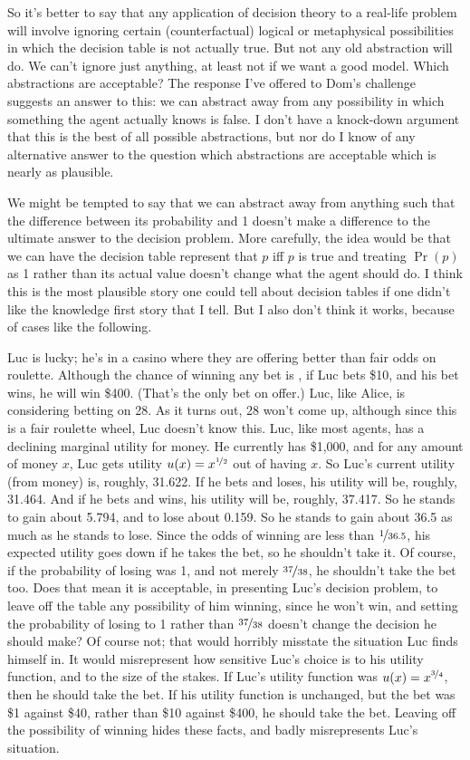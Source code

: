 \documentclass[11pt,oneside]{book}
\begin{document}
So it's better to say that any application of decision theory to a real-life problem will involve ignoring certain (counterfactual) logical or metaphysical possibilities in which the decision table is not actually true. But not any old abstraction will do. We can't ignore just anything, at least not if we want a good model. Which abstractions are acceptable? The response I've offered to Dom's challenge suggests an answer to this: we can abstract away from any possibility in which something the agent actually knows is false. I don't have a knock-down argument that this is the best of all possible abstractions, but nor do I know of any alternative answer to the question which abstractions are acceptable which is nearly as plausible.

We might be tempted to say that we can abstract away from anything such that the difference between its probability and 1 doesn't make a difference to the ultimate answer to the decision problem. More carefully, the idea would be that we can have the decision table represent that $p$ iff $p$ is true and treating $\Pr(p)$ as 1 rather than its actual value doesn't change what the agent should do. I think this is the most plausible story one could tell about decision tables if one didn't like the knowledge first story that I tell. But I also don't think it works, because of cases like the following.

Luc is lucky; he's in a casino where they are offering better than fair odds on roulette. Although the chance of winning any bet is , if Luc bets \$10, and his bet wins, he will win \$400. (That's the only bet on offer.) Luc, like Alice, is considering betting on 28. As it turns out, 28 won't come up, although since this is a fair roulette wheel, Luc doesn't know this. Luc, like most agents, has a declining marginal utility for money. He currently has \$1,000, and for any amount of money $x$, Luc gets utility $u(x) = x^{\nicefrac{1}{2}}$ out of having $x$. So Luc's current utility (from money) is, roughly, 31.622. If he bets and loses, his utility will be, roughly, 31.464. And if he bets and wins, his utility will be, roughly, 37.417. So he stands to gain about 5.794, and to lose about 0.159. So he stands to gain about 36.5 as much as he stands to lose. Since the odds of winning are less than $\nicefrac{1}{36.5}$, his expected utility goes down if he takes the bet, so he shouldn't take it. Of course, if the probability of losing was 1, and not merely $\nicefrac{37}{38}$, he shouldn't take the bet too. Does that mean it is acceptable, in presenting Luc's decision problem, to leave off the table any possibility of him winning, since he won't win, and setting the probability of losing to 1 rather than $\nicefrac{37}{38}$ doesn't change the decision he should make? Of course not; that would horribly misstate the situation Luc finds himself in. It would misrepresent  how sensitive Luc's choice is to his utility function, and to the size of the stakes. If Luc's utility function was $u(x) = x^{\nicefrac{3}{4}}$, then he should take the bet. If his utility function is unchanged, but the bet was \$1 against \$40, rather than \$10 against \$400, he should take the bet. Leaving off the possibility of winning hides these facts, and badly misrepresents Luc's situation.
\end{document}
